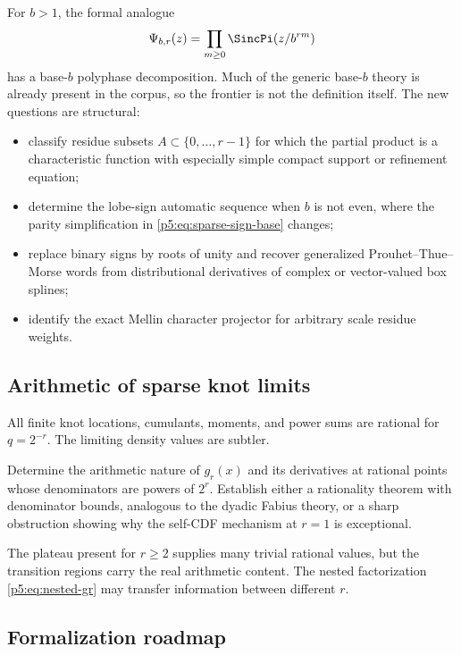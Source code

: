 \documentclass[11pt]{article}
\theoremstyle{definition}
\theoremstyle{remark}
\begin{document}
For $b>1$, the formal analogue
\begin{equation}
 \Psi_{b,r}(z)=\prod_{m\ge0}\SincPi(z/b^{rm})              \label{p5:eq:base-b-sparse}
\end{equation}
has a base-$b$ polyphase decomposition.  Much of the generic base-$b$ theory is
already present in the corpus, so the frontier is not the definition itself.
The new questions are structural:
\begin{itemize}
\item classify residue subsets $A\subset\{0,\ldots,r-1\}$ for which the
      partial product is a characteristic function with especially simple
      compact support or refinement equation;
\item determine the lobe-sign automatic sequence when $b$ is not even, where
      the parity simplification in \eqref{p5:eq:sparse-sign-base} changes;
\item replace binary signs by roots of unity and recover generalized
      Prouhet--Thue--Morse words from distributional derivatives of complex or
      vector-valued box splines;
\item identify the exact Mellin character projector for arbitrary scale
      residue weights.
\end{itemize}

\subsection{Arithmetic of sparse knot limits}

All finite knot locations, cumulants, moments, and power sums are rational for
$q=2^{-r}$.  The limiting density values are subtler.

\begin{openproblem}
Determine the arithmetic nature of $g_r(x)$ and its derivatives at rational
points whose denominators are powers of $2^r$.  Establish either a rationality
theorem with denominator bounds, analogous to the dyadic Fabius theory, or a
sharp obstruction showing why the self-CDF mechanism at $r=1$ is exceptional.
\end{openproblem}

The plateau present for $r\ge2$ supplies many trivial rational values, but the
transition regions carry the real arithmetic content.  The nested
factorization \eqref{p5:eq:nested-gr} may transfer information between different
$r$.

\subsection{Formalization roadmap}
\end{document}
